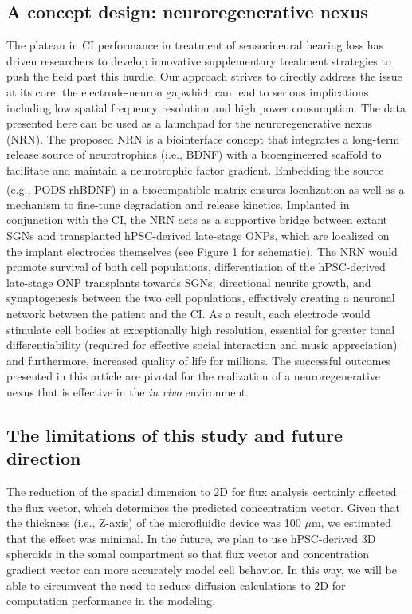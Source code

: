 \documentclass[review]{elsarticle}
\begin{document}
\subsection{A concept design: neuroregenerative nexus}
The plateau in CI performance in treatment of sensorineural hearing loss has driven researchers to develop innovative supplementary treatment strategies to push the field past this hurdle. Our approach strives to directly address the issue at its core: the electrode-neuron gap\textendash which can lead to serious implications including low spatial frequency resolution and high power consumption. The data presented here can be used as a launchpad for the neuroregenerative nexus (NRN). The proposed NRN is a biointerface concept that integrates a long-term release source of neurotrophins (i.e., BDNF) with a bioengineered scaffold to facilitate and maintain a neurotrophic factor gradient. Embedding the source (e.g., PODS\textsuperscript{\textregistered}-rhBDNF) in a biocompatible matrix ensures localization as well as a mechanism to fine-tune degradation and release kinetics. Implanted in conjunction with the CI, the NRN acts as a supportive bridge between extant SGNs and transplanted hPSC-derived late-stage ONPs, which are localized on the implant electrodes themselves (see Figure 1 for schematic). The NRN would promote survival of both cell populations, differentiation of the hPSC-derived late-stage ONP transplants towards SGNs, directional neurite growth, and synaptogenesis between the two cell populations, effectively creating a neuronal network between the patient and the CI. As a result, each electrode would stimulate cell bodies at exceptionally high resolution, essential for greater tonal differentiability (required for effective social interaction and music appreciation) and furthermore, increased quality of life for millions. The successful outcomes presented in this article are pivotal for the realization of a neuroregenerative nexus that is effective in the \textit{in vivo} environment. 

\subsection{The limitations of this study and future direction}
The reduction of the spacial dimension to 2D  for flux analysis certainly affected the flux vector, which determines the predicted concentration vector. Given that the thickness (i.e., Z-axis) of the microfluidic device was 100 $\mu$m, we estimated that the effect was minimal. In the future, we plan to use hPSC-derived 3D spheroids in the somal compartment so that flux vector and concentration gradient vector can more accurately model cell behavior. In this way, we will be able to circumvent the need to reduce diffusion calculations to 2D for computation performance in the modeling. 
\end{document}
